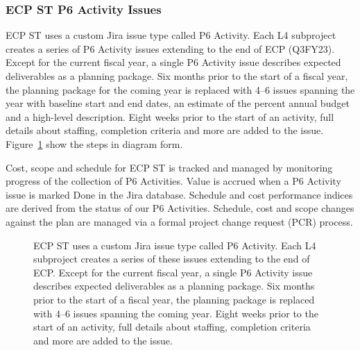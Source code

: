 \subsubsection{ECP ST P6 Activity Issues}

ECP ST uses a custom Jira issue type called P6 Activity.  Each L4 subproject creates a series of P6 Activity issues extending to the end of ECP (Q3FY23).  Except for the current fiscal year, a single P6 Activity issue describes expected deliverables as a planning package.  Six months prior to the start of a fiscal year, the planning package for the coming year is replaced with 4--6 issues spanning the year with baseline start and end dates, an estimate of the percent annual budget and a high-level description.  Eight weeks prior to the start of an activity, full details about staffing, completion criteria and more are added to the issue.  Figure~\ref{fig:planning-process} show the steps in diagram form.  

Cost, scope and schedule for ECP ST is tracked and managed by monitoring progress of the collection of P6 Activities.  Value is accrued when a P6 Activity issue is marked Done in the Jira database.  Schedule and cost performance indices are derived from the status of our P6 Activities.  Schedule, cost and scope changes against the plan are managed via a formal project change request (PCR) process.

\begin{figure}
	\centering
	\caption{ECP ST uses a custom Jira issue type called P6 Activity.  Each L4 subproject creates a series of these issues extending to the end of ECP.  Except for the current fiscal year, a single P6 Activity issue describes expected deliverables as a planning package.  Six months prior to the start of a fiscal year, the planning package is replaced with 4--6 issues spanning the coming year.  Eight weeks prior to the start of an activity, full details about staffing, completion criteria and more are added to the issue.}
	\label{fig:planning-process}
\end{figure}


